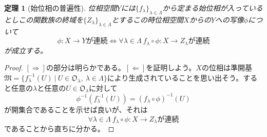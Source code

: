 \documentclass{jsarticle}
\newtheorem{theorem}{定理}
\begin{document}
\begin{theorem}[始位相の普遍性]位相空間$Y$には$\{f_{\lambda}\}_{\lambda \in \Lambda}$から定まる始位相が入っているとしこの関数族の終域を$\{Z_{\lambda}\}_{\lambda \in \Lambda}$とするこの時位相空間$X$からの$Y$への写像$\phi$について
\[
\phi :X\rightarrow Yが連続\Leftrightarrow \forall \lambda\in \Lambda\ f_{\lambda}\circ \phi
: X\rightarrow Z_{\lambda}が連続
\]が成立する。
\end{theorem}
\begin{proof}
$[\Rightarrow]$の部分は明らかである。$[\Leftarrow]$を証明しよう。$X$の位相は準開基$\mathfrak{M}=\{f_{\lambda}^{-1}(U)\ |\ U\in \mathfrak{O}_{\lambda},\ \lambda\in \Lambda \}$により生成されていることを思い出そう。すると任意の$\lambda$と任意の$U\in \mathfrak{O}_{\lambda}$に対して
\[
\phi^{-1}(f_{\lambda}^{-1}(U))=(f_{\lambda}\circ \phi)^{-1}(U)
\]が開集合であることを示せば良いが、それは
\[
\forall \lambda\in \Lambda\ f_{\lambda}\circ \phi: X\rightarrow Z_{\lambda}が連続
\]であることから直ちに分かる。
\end{proof}
\end{document}
